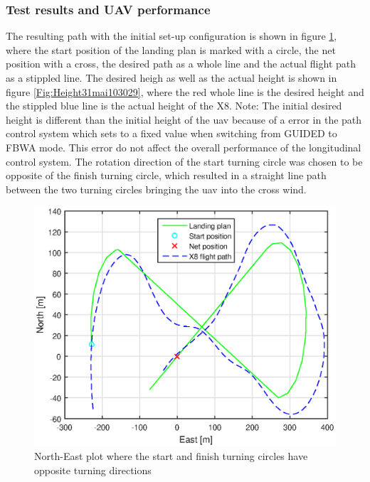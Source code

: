 \subsubsection{Test results and UAV performance}
The resulting path with the initial set-up configuration is shown in figure \ref{Fig:NorthEast31mai103029}, where the start position of the landing plan is marked with a circle, the net position with a cross, the desired path as a whole line and the actual flight path as a stippled line. The desired heigh as well as the actual height is shown in figure \ref{Fig:Height31mai103029}, where the red whole line is the desired height and the stippled blue line is the actual height of the X8. Note: The initial desired height is different than the initial height of the \gls{uav} because of a error in the path control system which sets to a fixed  value when switching from GUIDED to FBWA mode. This error do not affect the overall performance of the longitudinal control system. The rotation direction of the start turning circle was chosen to be opposite of the finish turning circle, which resulted in a straight line path between the two turning circles bringing the \gls{uav} into the cross wind.
\begin{figure}[H]
	\centering
		\includegraphics[scale=0.7]{figs/Experiment/NorthEast31mai103029.eps}
		\caption{North-East plot where the start and finish turning circles have opposite turning directions}
		\label{Fig:NorthEast31mai103029}
\end{figure}
